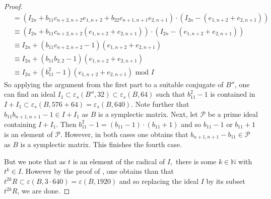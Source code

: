 \documentclass[12pt]{amsart}
\newcommand{\C}[1]{{\mathcal #1}}
\theoremstyle{definition}\newtheorem{definition}[theorem]{Definition}
\theoremstyle{remark}\newtheorem{remark}[theorem]{Remark}
\theoremstyle{definition}\newtheorem{case}{Case}
\begin{document}
\begin{proof}
\begin{align*}
&=(I_{2n}+b_{11}c_{n+2,n+2}e_{1,n+2}+b_{22}c_{n+1,n+1}e_{2,n+1})\cdot(I_{2n}-(e_{1,n+2}+e_{2,n+1}))\\
&\equiv (I_{2n}+b_{11}c_{n+2,n+2}(e_{1,n+2}+e_{2,n+1}))\cdot(I_{2n}-(e_{1,n+2}+e_{2,n+1}))\\
&\equiv I_{2n}+(b_{11}c_{n+2,n+2}-1)(e_{1,n+2}+e_{2,n+1})\\
&\equiv I_{2n}+(b_{11}b_{2,2}-1)(e_{1,n+2}+e_{2,n+1})\\
&\equiv I_{2n}+(b_{11}^2-1)(e_{1,n+2}+e_{2,n+1})\text{ mod }I
\end{align*}
So applying the argument from the first part to a suitable conjugate of $B''$, one can find an ideal $I_1\subset\varepsilon_s(B'',32)\subset\varepsilon_s(B,64)$ such that $b_{11}^2-1$ is contained in $I+I_1\subset\varepsilon_s(B,576+64)=\varepsilon_s(B,640).$ Note further that $b_{11}b_{n+1,n+1}-1\in I+I_1$ as $B$ is a symplectic matrix. Next, let $\C P$ be a prime ideal containing $I+I_1.$ Then $b_{11}^2-1=(b_{11}-1)\cdot (b_{11}+1)$ and so $b_{11}-1$ or $b_{11}+1$ is an element of $\C P.$ However, in both cases one obtains that $b_{n+1,n+1}-b_{11}\in\C P$ as $B$ is a symplectic matrix. This finishes the fourth case. 

But we note that as $t$ is an element of the radical of $I,$ there is some $k\in\mathbb{N}$ with $t^k\in I.$ However by the proof of \cite[Lemma~4.8(3)]{General_strong_bound}, one obtains than that $t^{2k}R\subset\varepsilon(B,3\cdot 640)=\varepsilon(B,1920)$ and so replacing the ideal $I$ by its subset $t^{2k}R$, we are done.
\end{proof}



\end{document}

